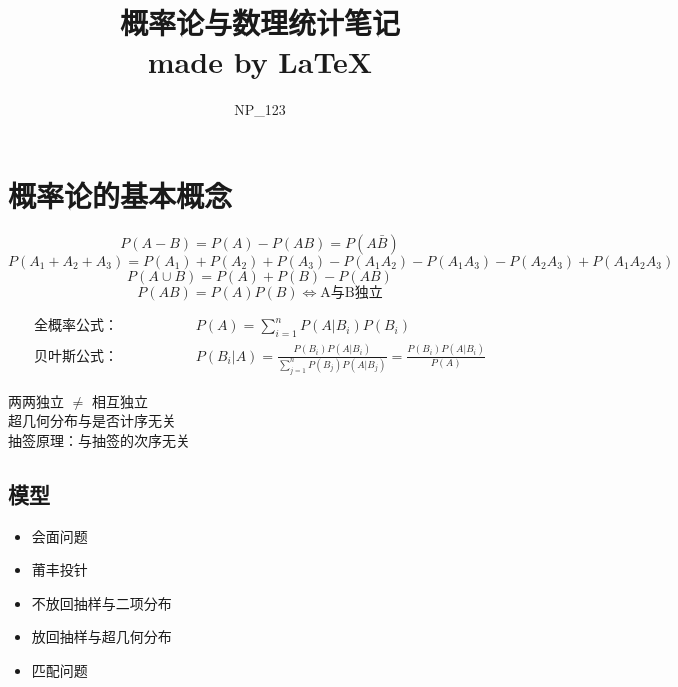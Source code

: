 \documentclass{article}
\title{\Huge 概率论与数理统计笔记    \\\large made by  \LaTeX}
\author{NP\_123}
\begin{document}
 
\maketitle
\clearpage
\section*{\center\Huge 概率论的基本概念}
\begin{large}
\begin{tcolorbox}
    [colback=Emerald!10,colframe=cyan!40!black,title=\textbf{公式}]
    \[P(A-B)=P(A)-P(AB)=P(A\bar{B})\]
    \[P(A_1+A_2+A_3)=P(A_1)+P(A_2)+P(A_3)-P(A_1A_2)-P(A_1A_3)-P(A_2A_3)+P(A_1A_2A_3)\]
    \[P(A\cup B)=P(A)+P(B)-P(AB)\]
    \[P(AB)=P(A)P(B)\Longleftrightarrow \mbox{A与B独立}\]
\begin{nonumber}
\begin{align}
    \text{全概率公式：}\hspace{2cm}
    &P(A)=\sum_{i=1}^{n}P(A|B_i)P(B_i)\\
    \text{贝叶斯公式：}\hspace{2cm}
    &P(B_i|A)=\frac{P(B_i)P(A|B_i)}{\sum_{j=1}^{n}P(B_j)P(A|B_j)}=\frac{P(B_i)P(A|B_i)}{P(A)}
\end{align}
\end{nonumber}
\end{tcolorbox}
\end{large}

\begin{tcolorbox}
    [colback=brownshade,colframe=Sepia,title=\textbf{概念}]
    两两独立 $\neq$ 相互独立\\
    超几何分布与是否计序无关\\
    抽签原理：与抽签的次序无关
\end{tcolorbox}
\subsection*{模型}

\begin{itemize}
    \item 会面问题
    \item 莆丰投针
    \item 不放回抽样与二项分布
    \item 放回抽样与超几何分布
    \item 匹配问题
\end{itemize}
\clearpage
 
\end{document}
